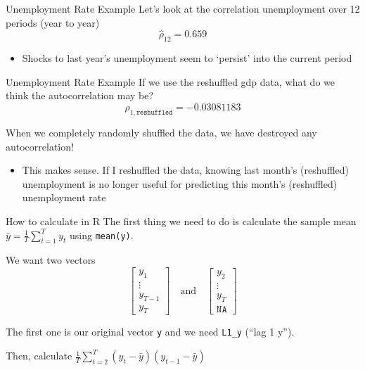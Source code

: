 \documentclass[aspectratio=169,t,11pt,table]{beamer}
\begin{document}

\begin{frame}{Unemployment Rate Example}
  Let's look at the correlation unemployment over 12 periods (year to year)
  $$
    \hat{\rho}_{12} = 0.659
  $$
  \vspace*{-\bigskipamount}
  \begin{itemize}
    \item Shocks to last year's unemployment seem to `persist' into the current period
  \end{itemize}
\end{frame}

\begin{frame}{Unemployment Rate Example}
  If we use the reshuffled gdp data, what do we think the autocorrelation may be?
  \pause
  $$
    \hat{\rho}_{1, \texttt{reshuffled}} =  -0.03081183
  $$  

  \bigskip
  When we completely randomly shuffled the data, we have destroyed any autocorrelation! 
  \begin{itemize}
    \item This makes sense. If I reshuffled the data, knowing last month's (reshuffled) unemployment is no longer useful for predicting this month's (reshuffled) unemployment rate
  \end{itemize}
\end{frame}

\begin{frame}{How to calculate in R}
  The first thing we need to do is calculate the sample mean $\bar{y} = \frac{1}{T} \sum_{t=1}^T y_t$ using \texttt{mean(y)}.

  \bigskip
  We want two vectors
  $$
    \begin{bmatrix}
      y_1 \\
      \vdots \\
      y_{T-1} \\ 
      y_T
    \end{bmatrix}
    \quad \text{and} \quad
    \begin{bmatrix}
      y_2 \\
      \vdots \\
      y_{T} \\
      \texttt{NA}
    \end{bmatrix}
  $$

  \bigskip
  The first one is our original vector \texttt{y} and we need \texttt{L1\_y} (``lag 1 y'').

  \bigskip
  Then, calculate $\frac{1}{T} \sum_{t=2}^T (y_t - \bar{y}) (y_{t-1} - \bar{y})$
\end{frame}
\end{document}
